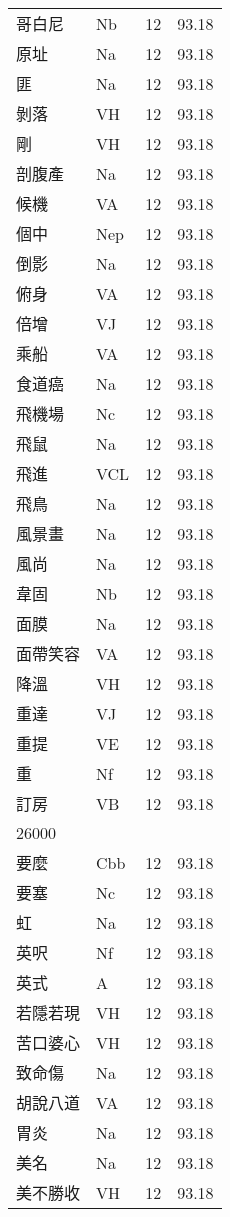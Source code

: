 \documentclass[twocolumn]{book}
\begin{document}
\begin{supertabular}{llrr}
哥白尼 & Nb & 12 &  93.18\\
原址 & Na & 12 &  93.18\\
匪 & Na & 12 &  93.18\\
剝落 & VH & 12 &  93.18\\
剛 & VH & 12 &  93.18\\
剖腹產 & Na & 12 &  93.18\\
候機 & VA & 12 &  93.18\\
個中 & Nep & 12 &  93.18\\
倒影 & Na & 12 &  93.18\\
俯身 & VA & 12 &  93.18\\
倍增 & VJ & 12 &  93.18\\
乘船 & VA & 12 &  93.18\\
食道癌 & Na & 12 &  93.18\\
飛機場 & Nc & 12 &  93.18\\
飛鼠 & Na & 12 &  93.18\\
飛進 & VCL & 12 &  93.18\\
飛鳥 & Na & 12 &  93.18\\
風景畫 & Na & 12 &  93.18\\
風尚 & Na & 12 &  93.18\\
韋固 & Nb & 12 &  93.18\\
面膜 & Na & 12 &  93.18\\
面帶笑容 & VA & 12 &  93.18\\
降溫 & VH & 12 &  93.18\\
重達 & VJ & 12 &  93.18\\
重提 & VE & 12 &  93.18\\
重 & Nf & 12 &  93.18\\
訂房 & VB & 12 &  93.18\\
26000\\
要麼 & Cbb & 12 &  93.18\\
要塞 & Nc & 12 &  93.18\\
虹 & Na & 12 &  93.18\\
英呎 & Nf & 12 &  93.18\\
英式 & A & 12 &  93.18\\
若隱若現 & VH & 12 &  93.18\\
苦口婆心 & VH & 12 &  93.18\\
致命傷 & Na & 12 &  93.18\\
胡說八道 & VA & 12 &  93.18\\
胃炎 & Na & 12 &  93.18\\
美名 & Na & 12 &  93.18\\
美不勝收 & VH & 12 &  93.18\\

\end{supertabular}
\end{document}
